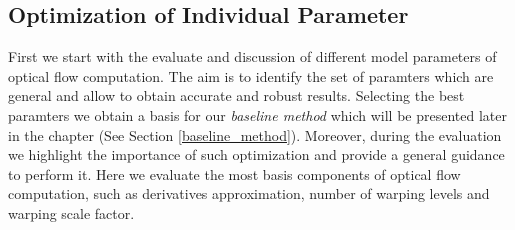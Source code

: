 
%



\subsection{Optimization of Individual Parameter}

First we start with the evaluate and discussion of different model parameters of optical flow computation. The aim is to identify the set of paramters which are general and allow to obtain accurate and robust results. Selecting the best paramters we obtain a basis for our \textit{baseline method} which will be presented later in the chapter (See Section \ref{baseline_method}). Moreover, during the evaluation we highlight the importance of such optimization and provide a general guidance to perform it. Here we evaluate the most basis components of optical flow computation, such as derivatives approximation, number of warping levels and warping scale factor.





